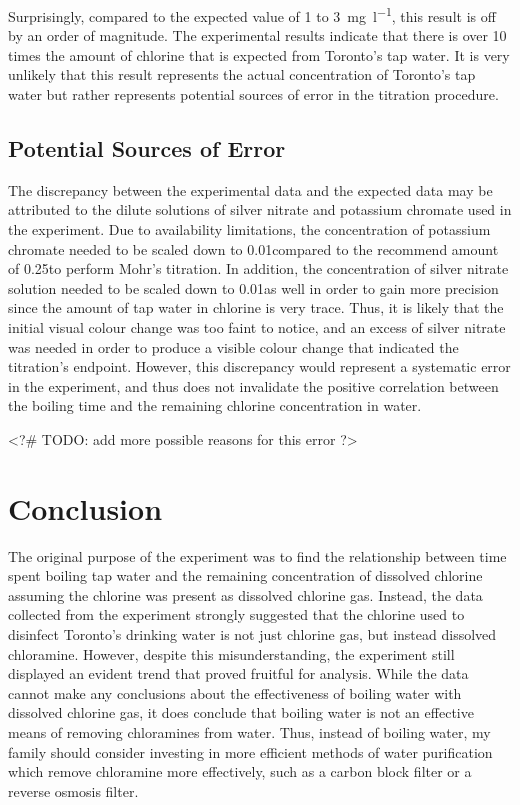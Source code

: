 \documentclass[11pt]{article}
\begin{document}
Surprisingly, compared to the expected value of 1 to \SI{3}{\mg\per\litre}, this result is off by an order of magnitude. The experimental results indicate that there is over 10 times the amount of chlorine that is expected from Toronto's tap water. It is very unlikely that this result represents the actual concentration of Toronto's tap water but rather represents potential sources of error in the titration procedure.

\subsection{Potential Sources of Error}

The discrepancy between the experimental data and the expected data may be attributed to the dilute solutions of silver nitrate and potassium chromate used in the experiment. Due to availability limitations, the concentration of potassium chromate needed to be scaled down to 0.01\mpl compared to the recommend amount of 0.25\mpl to perform Mohr's titration. In addition, the concentration of silver nitrate solution needed to be scaled down to 0.01\mpl as well in order to gain more precision since the amount of tap water in chlorine is very trace. Thus, it is likely that the initial visual colour change was too faint to notice, and an excess of silver nitrate was needed in order to produce a visible colour change that indicated the titration's endpoint. However, this discrepancy would represent a systematic error in the experiment, and thus does not invalidate the positive correlation between the boiling time and the remaining chlorine concentration in water. %

<?# TODO: add more possible reasons for this error ?>

\section{Conclusion}

The original purpose of the experiment was to find the relationship between time spent boiling tap water and the remaining concentration of dissolved chlorine assuming the chlorine was present as dissolved chlorine gas. Instead, the data collected from the experiment strongly suggested that the chlorine used to disinfect Toronto's drinking water is not just chlorine gas, but instead dissolved chloramine. However, despite this misunderstanding, the experiment still displayed an evident trend that proved fruitful for analysis. While the data cannot make any conclusions about the effectiveness of boiling water with dissolved chlorine gas, it does conclude that boiling water is not an effective means of removing chloramines from water. Thus, instead of boiling water, my family should consider investing in more efficient methods of water purification which remove chloramine more effectively, such as a carbon block filter or a reverse osmosis filter.
\end{document}

